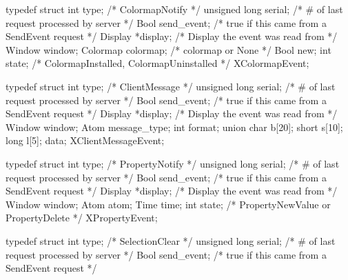 \documentclass{report}
\begin{document}
\begin{itemize}
            \begin{cppcode}
                typedef struct {
                    int type;                   /* ColormapNotify */
                    unsigned long serial;       /* # of last request processed by server */
                    Bool send_event;            /* true if this came from a SendEvent request */
                    Display *display;           /* Display the event was read from */
                    Window window;
                    Colormap colormap;          /* colormap or None */
                    Bool new;
                    int state;                  /* ColormapInstalled, ColormapUninstalled */
                } XColormapEvent;
            \end{cppcode}
            \begin{cppcode}
                typedef struct {
                    int type;                   /* ClientMessage */
                    unsigned long serial;       /* # of last request processed by server */
                    Bool send_event;            /* true if this came from a SendEvent request */
                    Display *display;           /* Display the event was read from */
                    Window window;
                    Atom message_type;
                    int format;
                    union {
                        char b[20];
                        short s[10];
                        long l[5];
                    } data;
                } XClientMessageEvent;
            \end{cppcode}
            \begin{cppcode}
                typedef struct {
                    int type;               /* PropertyNotify */
                    unsigned long serial;   /* # of last request processed by server */
                    Bool send_event;        /* true if this came from a SendEvent request */
                    Display *display;       /* Display the event was read from */
                    Window window;
                    Atom atom;
                    Time time;
                    int state;              /* PropertyNewValue or PropertyDelete */
                } XPropertyEvent;
            \end{cppcode}
            \begin{cppcode}
                typedef struct {
                    int type;                   /* SelectionClear */
                    unsigned long serial;       /* # of last request processed by server */
                    Bool send_event;            /* true if this came from a SendEvent request */
}
\end{cppcode}
\end{itemize}
\end{document}
